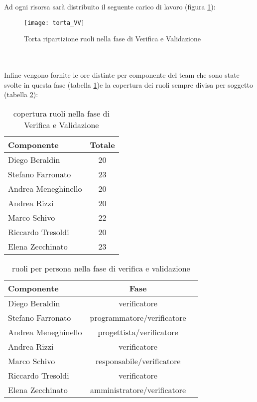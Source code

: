 \clearpage
Ad ogni risorsa sarà distribuito il seguente carico di lavoro (figura \ref{fig:ruolivv}):\\
\begin{figure}[h!]
\centering
  \texttt{[image: torta\_VV]}
\caption{Torta ripartizione ruoli nella fase di Verifica e Validazione}\label{fig:ruolivv}
\end{figure}
\\\\
Infine vengono fornite le ore distinte per componente del team che sono state svolte in questa fase (tabella \ref{tab:ruolivv2})e la copertura dei ruoli sempre divisa per soggetto (tabella \ref{tab:ruolivv3}):\\
\begin{table}[h]
\centering
\begin{tabular}{|l|c|}
\hline
Componente& Totale \\
\hline
Diego Beraldin & 20\\
Stefano Farronato & 23\\
Andrea Meneghinello & 20\\
Andrea Rizzi & 20\\
Marco Schivo & 22\\
Riccardo Tresoldi & 20\\
Elena Zecchinato & 23\\
\hline
\end{tabular}
\caption{copertura ruoli nella fase di Verifica e Validazione}\label{tab:ruolivv2}
\end{table}

\begin{table}[h!]
\centering
\begin{tabular}{|l|c|c|}
\hline
Componente& Fase\\
\hline
Diego Beraldin &verificatore\\
Stefano Farronato & programmatore/verificatore\\
Andrea Meneghinello &progettista/verificatore\\
Andrea Rizzi &verificatore\\
Marco Schivo &responsabile/verificatore\\
Riccardo Tresoldi &verificatore\\
Elena Zecchinato &amministratore/verificatore\\
\hline
\end{tabular}
\caption{ruoli per persona nella fase di verifica e validazione}\label{tab:ruolivv3}
\end{table}

